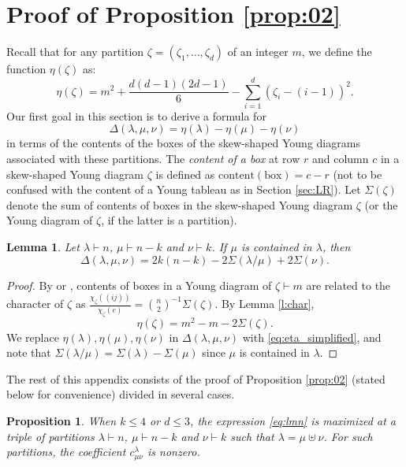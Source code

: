 \documentclass[12pt,dvipsnames,accepted=2016-08-18,a4paper,onecolumn]{quantumarticle}
\def\la{\lambda}
\def\la{\lambda}
\numberwithin{equation}{section}
\newtheorem{lemma}[theorem]{Lemma}
\newtheorem{proposition}[theorem]{Proposition}
\theoremstyle{definition}
\begin{document}
\section{Proof of Proposition \ref{prop:02}}\label{app:LR}

\def\SoC{\Sigma}

Recall that for any partition $\zeta = (\zeta_1, \dots, \zeta_d)$ of an integer $m$, we define the function $\eta(\zeta)$ as:
\[
\eta(\zeta) = m^2 + \frac{d(d-1)(2d-1)}{6} - \sum_{i=1}^d (\zeta_i - (i-1))^2.
\]
Our first goal in this section is to derive a formula for
\begin{equation}\label{eq:lmn1}
\Delta(\lambda,\mu,\nu) = \eta(\lambda) - \eta(\mu) - \eta(\nu)
\end{equation}
in terms of the contents of the boxes of the skew-shaped Young diagrams associated with these partitions. The \textit{content of a box} at row $r$ and column $c$ in a skew-shaped Young diagram $\zeta$ is defined as $\text{content}(\text{box}) = c - r$ (not to be confused with the content of a Young tableau as in Section \ref{sec:LR}). Let $\SoC(\zeta)$ denote the sum of contents of boxes in the skew-shaped Young diagram $\zeta$ (or the Young diagram of $\zeta$, if the latter is a partition).

\begin{lemma}\label{l:boxcontent}
Let $\la \vdash n$, $\mu \vdash n-k$ and $\nu \vdash k$. If $\mu$ is contained in $\la$, then
\[
\Delta(\lambda,\mu,\nu) = 2k(n-k) - 2\SoC(\lambda/\mu) +2\SoC(\nu).
\]
\end{lemma}

\begin{proof}
By \cite[Theorem 4]{Lassalle} or \cite{Fro01}, contents of boxes in a Young diagram of $\zeta\vdash m$ are related to the character of $\zeta$ as $\frac{\chi_\zeta((ij))}{\chi_\zeta(e)}=\binom{n}{2}^{-1} \SoC(\zeta)$. By Lemma \ref{l:char}, 
\begin{equation} \label{eq:eta_simplified}
\eta(\zeta) = m^2 - m - 2 \SoC(\zeta).
\end{equation}
We replace $\eta(\lambda),\eta(\mu),\eta(\nu)$ in $\Delta(\la,\mu,\nu)$ with \eqref{eq:eta_simplified},
and note that $\SoC(\la/\mu)=\SoC(\lambda)-\SoC(\mu)$ since $\mu$ is contained in $\lambda$.
\end{proof}

The rest of this appendix consists of the proof of Proposition \ref{prop:02} (stated below for convenience) divided in several cases.

\begin{proposition}\label{prop:02A}
When $k\leq 4$ or $d\le3$, the expression \eqref{eq:lmn} is maximized at a triple of partitions $\lambda \vdash n$,  $\mu \vdash n-k$ and $\nu \vdash k$ such that $\lambda=\mu\uplus\nu$.
For such partitions, the coefficient $c^\lambda_{\mu \nu}$ is nonzero.
\end{proposition}
\end{document}
